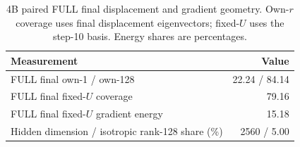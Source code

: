 \begin{table}[!htbp]
\centering
\caption{4B paired FULL final displacement and gradient geometry. Own-$r$ coverage uses final displacement eigenvectors; fixed-$U$ uses the step-10 basis. Energy shares are percentages.}
\label{tab:paired4b_adapter_geometry}
\small
\setlength{\tabcolsep}{3pt}
\begin{tabular}{lr}
\toprule
Measurement & Value \\
\midrule
FULL final own-1 / own-128 & 22.24 / 84.14 \\
FULL final fixed-$U$ coverage & 79.16 \\
FULL final fixed-$U$ gradient energy & 15.18 \\
Hidden dimension / isotropic rank-128 share (\%) & 2560 / 5.00 \\
\bottomrule
\end{tabular}
\end{table}
